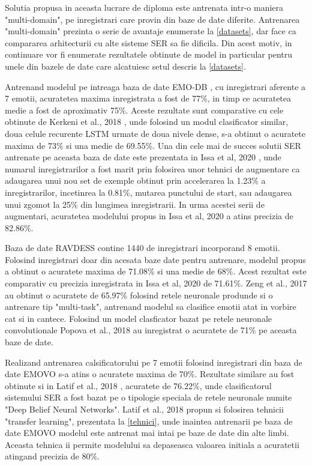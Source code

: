 \documentclass[a4paper,12pt]{book}
\begin{document}
		 Solutia propusa in aceasta lucrare de diploma este antrenata intr-o maniera "multi-domain", pe inregistrari care provin din baze de date diferite. Antrenarea "multi-domain" prezinta o serie de avantaje enumerate la \ref{datasets}, dar face ca compararea arhitecturii cu alte sisteme SER sa fie dificila. Din acest motiv, in continuare vor fi enumerate rezultatele obtinute de model in particular pentru unele din bazele de date care alcatuiesc setul descris la \ref{datasets}. \par
		 Antrenand modelul pe intreaga baza de date EMO-DB \cite{emodb}, cu inregistrari aferente a 7 emotii, acuratetea maxima inregistrata a fost de 77\%, in timp ce acuratetea medie a fost de aproximativ 75\%. Aceste rezultate sunt comparative cu cele obtinute de Kerkeni et al., 2018 \cite{comp1}, unde folosind un modul clasificator similar, doua celule recurente LSTM urmate de doua nivele dense, s-a obtinut o acuratete maxima de 73\% si una medie de 69.55\%. Una din cele mai de succes solutii SER antrenate pe aceasta baza de date este prezentata in Issa et al, 2020 \cite{comp2}, unde numarul inregistrarilor a fost marit prin folosirea unor tehnici de augmentare ca adaugarea unui nou set de exemple obtinut prin accelerarea la 1.23\% a inregistrarilor, incetinrea la 0.81\%, mutarea punctului de start, sau adaugarea unui zgomot la 25\% din lungimea inregistrarii. In urma acestei serii de augmentari, acuratetea modelului propus in Issa et al, 2020 \cite{comp2} a atins precizia de 82.86\%.\par
		 Baza de date RAVDESS \cite{ravdess} contine 1440 de inregistrari incorporand 8 emotii. Folosind inregistrari doar din acesata baze date pentru antrenare, modelul propus a obtinut o acuratete maxima de 71.08\% si una medie de 68\%. Acest rezultat este comparativ cu precizia inregistrata in Issa et al, 2020 \cite{comp2} de 71.61\%. Zeng et al., 2017 \cite{comp3} au obtinut o acuratete de 65.97\% folosind retele neuronale produnde si o antrenare tip "multi-task", antrenand modelul sa clasifice emotii atat in vorbire cat si in cantece. Folosind un model clasficator bazat pe retele neuronale convolutionale Popova et al., 2018 \cite{comp4} au inregistrat o acuratete de 71\% pe aceasta baze de date. \par
		 Realizand antrenarea calsificatorului pe 7 emotii folosind inregistrari din baza de date EMOVO \cite{emovo} s-a atins o acuratete maxima de 70\%. Rezultate similare au fost obtinute si in Latif et al., 2018 \cite{comp5}, acuratete de 76.22\%, unde clasificatorul sistemului SER a fost bazat pe o tipologie speciala de retele neuronale numite "Deep Belief Neural Networks". Latif et al., 2018 \cite{comp5} propun si folosirea tehnicii "transfer learning", prezentata la \ref{tehnici}, unde inaintea antrenarii pe baza de date EMOVO modelul este antrenat mai intai pe baze de date din alte limbi. Aceasta tehnica ii permite modelului sa depaseasca valoarea initiala a acuratetii atingand precizia de 80\%. \par 
\end{document}

